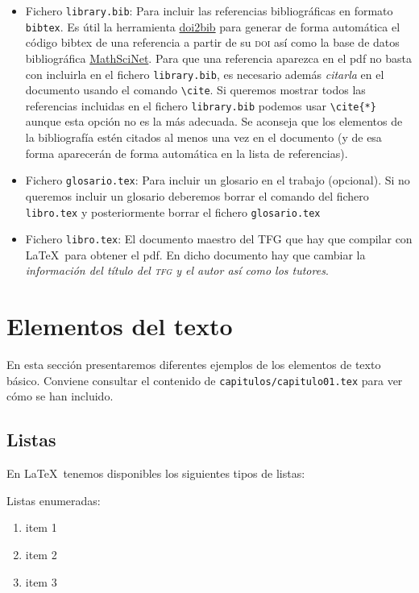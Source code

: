 \begin{itemize}
  \item Fichero \texttt{library.bib}: Para incluir las referencias bibliográficas en formato \texttt{bibtex}. Es útil la herramienta \href{https://www.doi2bib.org/}{doi2bib} para generar de forma automática el código bibtex de una referencia a partir de su \textsc{doi}  así como la base de datos bibliográfica \href{https://mathscinet.ams.org}{MathSciNet}. Para que una referencia aparezca en el pdf no basta con incluirla en el fichero \texttt{library.bib}, es necesario además \emph{citarla} en el documento usando el comando \verb+\cite+. Si queremos mostrar todos las referencias incluidas en el fichero \texttt{library.bib} podemos usar \verb+\cite{*}+ aunque esta opción no es la más adecuada. Se aconseja que los elementos de la bibliografía estén citados al menos una vez en el documento (y de esa forma aparecerán de forma automática en la lista de referencias).

  \item Fichero \texttt{glosario.tex}: Para incluir un glosario en el trabajo (opcional). Si no queremos incluir un glosario deberemos borrar el comando \verb++ del fichero \texttt{libro.tex} y posteriormente borrar el fichero \texttt{glosario.tex}

   \item Fichero \texttt{libro.tex}: El documento maestro del TFG que hay que compilar con \LaTeX\ para obtener el pdf. En dicho documento hay que cambiar la \emph{información del título del \textsc{tfg} y el autor así como los tutores}.
\end{itemize}



\section{Elementos del texto}

En esta sección presentaremos diferentes ejemplos de los elementos de texto básico. Conviene consultar el contenido de \texttt{capitulos/capitulo01.tex} para ver cómo se han incluido.

\subsection{Listas}
En \LaTeX\ tenemos disponibles los siguientes tipos de listas:

Listas enumeradas:
\begin{enumerate}
  \item item 1
  \item item 2
  \item item 3
\end{enumerate}

